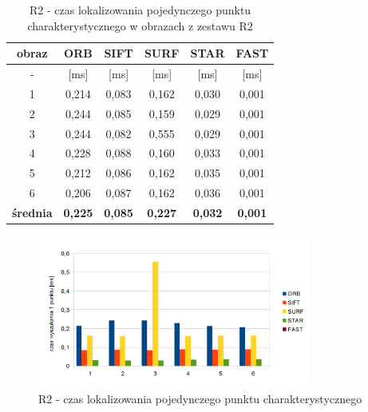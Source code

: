 \begin{table}[htbp]
  \centering
  \caption{R2 - czas lokalizowania pojedynczego punktu charakterystycznego w obrazach z zestawu R2}
    \begin{tabular}{|c|c|c|c|c|c|}
    \hline
    obraz & \textbf{ORB} & \textbf{SIFT} & \textbf{SURF} & \textbf{STAR} & \textbf{FAST} \\
    \hline
    -  & [ms] & [ms] & [ms] & [ms] & [ms] \\\hline
    1 & 0,214 & 0,083 & 0,162 & 0,030 & 0,001 \\
    2 & 0,244 & 0,085 & 0,159 & 0,029 & 0,001 \\
    3 & 0,244 & 0,082 & 0,555 & 0,029 & 0,001 \\
    4 & 0,228 & 0,088 & 0,160 & 0,033 & 0,001 \\
    5 & 0,212 & 0,086 & 0,162 & 0,035 & 0,001 \\
    6 & 0,206 & 0,087 & 0,162 & 0,036 & 0,001 \\\hline
    \textbf{średnia} & \textbf{0,225} & \textbf{0,085} & \textbf{0,227} & \textbf{0,032} & \textbf{0,001} \\
    \hline
    \end{tabular}%
  \label{tab:r2_f2}%
\end{table}%


\begin{figure}
\centering
\includegraphics[width=0.8\textwidth]{pict/slowik/r2/f2.png}
\caption{R2 - czas lokalizowania pojedynczego punktu charakterystycznego}
\label{fig:r2_f2}
\end{figure}

